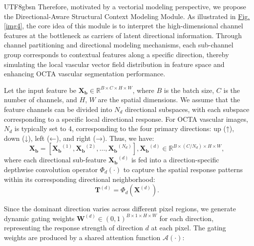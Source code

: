 \documentclass[times, review, 10pt]{elsarticle}
\begin{document}
\begin{CJK}{UTF8}{gbsn}
Therefore, motivated by a vectorial modeling perspective, we propose the Directional-Aware Structural Context Modeling Module. As illustrated in \hyperref[img4]{Fig. \ref*{img4}}, the core idea of this module is to interpret the high-dimensional channel features at the bottleneck as carriers of latent directional information. Through channel partitioning and directional modeling mechanisms, each sub-channel group corresponds to contextual features along a specific direction, thereby simulating the local vascular vector field distribution in feature space and enhancing OCTA vascular segmentation performance.
\par
Let the input feature be $\mathbf{X}_\mathbf{b} \in \mathbb{R}^{B \times C \times H \times W}$, where $B$ is the batch size, $C$ is the number of channels, and $H$, $W$ are the spatial dimensions. We assume that the feature channels can be divided into $N_d$ directional subspaces, with each subspace corresponding to a specific local directional response. For OCTA vascular images, $N_d$ is typically set to 4, corresponding to the four primary directions: up (↑), down (↓), left (←), and right (→). Thus, we have:
\begin{equation}
\mathbf{X_b}=[\mathbf{X_b}^{(1)},\mathbf{X_b}^{(2)},\ldots,\mathbf{X_b}^{(N_d)}],\mathbf{X_b}^{(d)}\in\mathbb{R}^{B\times(C/N_d)\times H\times W},
\end{equation}
where each directional sub-feature ${\mathbf{X}_\mathbf{b}}^{(d)}$ is fed into a direction-specific depthwise convolution operator $\Phi_d(\cdot)$ to capture the spatial response patterns within its corresponding directional neighborhood:
\begin{equation}
\mathbf{T}^{(d)}=\Phi_d(\mathbf{X}^{(d)}).
\end{equation}
\par
Since the dominant direction varies across different pixel regions, we generate dynamic gating weights $\mathbf{W}^{(d)} \in (0,1)^{B \times 1 \times H \times W}$ for each direction, representing the response strength of direction $d$ at each pixel. The gating weights are produced by a shared attention function $\mathcal{A}(\cdot)$:

\end{CJK}
\end{document}
